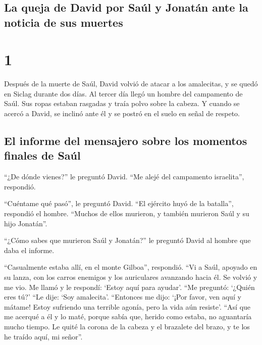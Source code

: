 \hypertarget{la-queja-de-david-por-sauxfal-y-jonatuxe1n-ante-la-noticia-de-sus-muertes}{%
\subsection{La queja de David por Saúl y Jonatán ante la noticia de sus
muertes}\label{la-queja-de-david-por-sauxfal-y-jonatuxe1n-ante-la-noticia-de-sus-muertes}}

\hypertarget{section}{%
\section{1}\label{section}}

 Después de la muerte de Saúl, David volvió de atacar a
los amalecitas, y se quedó en Siclag durante dos días.  Al
tercer día llegó un hombre del campamento de Saúl. Sus ropas estaban
rasgadas y traía polvo sobre la cabeza. Y cuando se acercó a David, se
inclinó ante él y se postró en el suelo en señal de respeto.

\hypertarget{el-informe-del-mensajero-sobre-los-momentos-finales-de-sauxfal}{%
\subsection{El informe del mensajero sobre los momentos finales de
Saúl}\label{el-informe-del-mensajero-sobre-los-momentos-finales-de-sauxfal}}

 ``¿De dónde vienes?'' le preguntó David. ``Me alejé del
campamento israelita'', respondió.

 ``Cuéntame qué pasó'', le preguntó David. ``El ejército
huyó de la batalla'', respondió el hombre. ``Muchos de ellos murieron, y
también murieron Saúl y su hijo Jonatán''.

 ``¿Cómo sabes que murieron Saúl y Jonatán?'' le preguntó
David al hombre que daba el informe.

 ``Casualmente estaba allí, en el monte Gilboa'',
respondió. ``Vi a Saúl, apoyado en su lanza, con los carros enemigos y
los auriculares avanzando hacia él.  Se volvió y me vio.
Me llamó y le respondí: `Estoy aquí para ayudar'.  ``Me
preguntó: `¿Quién eres tú?' ``Le dije: `Soy amalecita'. 
``Entonces me dijo: `¡Por favor, ven aquí y mátame! Estoy sufriendo una
terrible agonía, pero la vida aún resiste'.  ``Así que me
acerqué a él y lo maté, porque sabía que, herido como estaba, no
aguantaría mucho tiempo. Le quité la corona de la cabeza y el brazalete
del brazo, y te los he traído aquí, mi señor''.

